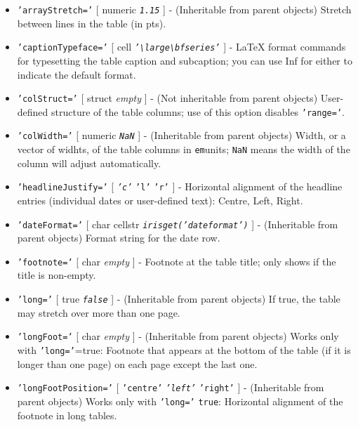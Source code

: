  \begin{itemize}
 \item
   \texttt{'arrayStretch='} {[} numeric \textbar{} \emph{\texttt{1.15}}
   {]} - (Inheritable from parent objects) Stretch between lines in the
   table (in pts).
 \item
   \texttt{'captionTypeface='} {[} cell \textbar{}
   \emph{\texttt{'\textbackslash{}large\textbackslash{}bfseries'}} {]} -
   LaTeX format commands for typesetting the table caption and
   subcaption; you can use Inf for either to indicate the default format.
 \item
   \texttt{'colStruct='} {[} struct \textbar{} \emph{empty} {]} - (Not
   inheritable from parent objects) User-defined structure of the table
   columns; use of this option disables \texttt{'range='}.
 \item
   \texttt{'colWidth='} {[} numeric \textbar{} \emph{\texttt{NaN}} {]} -
   (Inheritable from parent objects) Width, or a vector of widhts, of the
   table columns in \texttt{em}units; \texttt{NaN} means the width of the
   column will adjust automatically.
 \item
   \texttt{'headlineJustify='} {[} \emph{\texttt{'c'}} \textbar{}
   \texttt{'l'} \textbar{} \texttt{'r'} {]} - Horizontal alignment of the
   headline entries (individual dates or user-defined text): Centre,
   Left, Right.
 \item
   \texttt{'dateFormat='} {[} char \textbar{} cellstr \textbar{}
   \emph{\texttt{irisget('dateformat')}} {]} - (Inheritable from parent
   objects) Format string for the date row.
 \item
   \texttt{'footnote='} {[} char \textbar{} \emph{empty} {]} - Footnote
   at the table title; only shows if the title is non-empty.
 \item
   \texttt{'long='} {[} true \textbar{} \emph{\texttt{false}} {]} -
   (Inheritable from parent objects) If true, the table may stretch over
   more than one page.
 \item
   \texttt{'longFoot='} {[} char \textbar{} \emph{empty} {]} -
   (Inheritable from parent objects) Works only with
   \texttt{'long='}=true: Footnote that appears at the bottom of the
   table (if it is longer than one page) on each page except the last
   one.
 \item
   \texttt{'longFootPosition='} {[} \texttt{'centre'} \textbar{}
   \emph{\texttt{'left'}} \textbar{} \texttt{'right'} {]} - (Inheritable
   from parent objects) Works only with \texttt{'long='} \texttt{true}:
   Horizontal alignment of the footnote in long tables.

\end{itemize}
